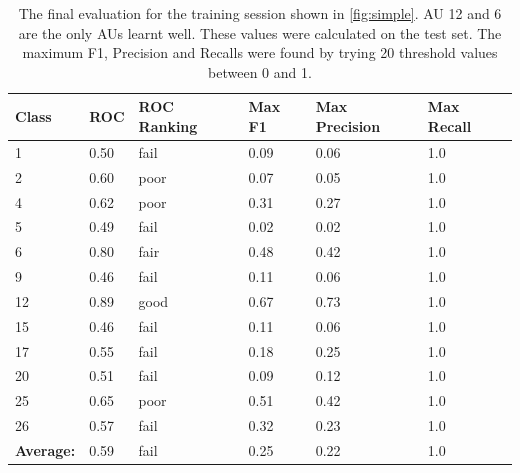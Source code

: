     \begin{table}[!h]
    \centering
    {\small
    \begin{tabular}{llllll}
    \hline
    \textbf{Class}    & \textbf{ROC} & \textbf{ROC Ranking} & \textbf{Max F1} & \textbf{Max Precision} & \textbf{Max Recall} \\ \hline
    1                 & 0.50         & fail         & 0.09            & 0.06                   & 1.0                 \\
    2                 & 0.60         & poor         & 0.07            & 0.05                   & 1.0                 \\
    4                 & 0.62         & poor         & 0.31            & 0.27                   & 1.0                 \\
    5                 & 0.49         & fail         & 0.02            & 0.02                   & 1.0                 \\
    6                 & 0.80         & fair         & 0.48            & 0.42                   & 1.0                 \\
    9                 & 0.46         & fail         & 0.11            & 0.06                   & 1.0                 \\
    12                & 0.89         & good         & 0.67            & 0.73                   & 1.0                 \\
    15                & 0.46         & fail         & 0.11            & 0.06                   & 1.0                 \\
    17                & 0.55         & fail         & 0.18            & 0.25                   & 1.0                 \\
    20                & 0.51         & fail         & 0.09            & 0.12                   & 1.0                 \\
    25                & 0.65         & poor         & 0.51            & 0.42                   & 1.0                 \\
    26                & 0.57         & fail         & 0.32            & 0.23                   & 1.0                 \\ \hline
    \textbf{Average:} & 0.59         & fail         & 0.25            & 0.22                   & 1.0                 \\ \hline
    \end{tabular} }
    \caption{The final evaluation for the training session shown in \ref{fig:simple}.
    AU 12 and 6 are the only AUs learnt well. These values were
    calculated on the test set. The maximum F1, Precision and Recalls
    were found by trying 20 threshold values between 0 and 1.}
    \label{my-label}
    \end{table}

